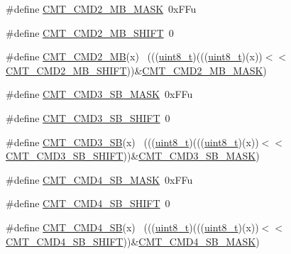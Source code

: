 \begin{DoxyCompactItemize}
\item 
\#define \hyperlink{group___c_m_t___register___masks_gac9616164033684cd0d73e63eb6381441}{C\+M\+T\+\_\+\+C\+M\+D2\+\_\+\+M\+B\+\_\+\+M\+A\+SK}~0x\+F\+Fu
\item 
\#define \hyperlink{group___c_m_t___register___masks_gaeff28d00f2825fc455b2f37c218ce24f}{C\+M\+T\+\_\+\+C\+M\+D2\+\_\+\+M\+B\+\_\+\+S\+H\+I\+FT}~0
\item 
\#define \hyperlink{group___c_m_t___register___masks_gab2a79ddcd28a1921a654f06e9c9cb15f}{C\+M\+T\+\_\+\+C\+M\+D2\+\_\+\+MB}(x)                                                  ~(((\hyperlink{_p_e___types_8h_aba7bc1797add20fe3efdf37ced1182c5}{uint8\+\_\+t})(((\hyperlink{_p_e___types_8h_aba7bc1797add20fe3efdf37ced1182c5}{uint8\+\_\+t})(x))$<$$<$\hyperlink{group___c_m_t___register___masks_gaeff28d00f2825fc455b2f37c218ce24f}{C\+M\+T\+\_\+\+C\+M\+D2\+\_\+\+M\+B\+\_\+\+S\+H\+I\+FT}))\&\hyperlink{group___c_m_t___register___masks_gac9616164033684cd0d73e63eb6381441}{C\+M\+T\+\_\+\+C\+M\+D2\+\_\+\+M\+B\+\_\+\+M\+A\+SK})
\item 
\#define \hyperlink{group___c_m_t___register___masks_ga0ee814da2957c935fad8b236d52b22f5}{C\+M\+T\+\_\+\+C\+M\+D3\+\_\+\+S\+B\+\_\+\+M\+A\+SK}~0x\+F\+Fu
\item 
\#define \hyperlink{group___c_m_t___register___masks_ga87210814a860e3ea66f06747156fbd9a}{C\+M\+T\+\_\+\+C\+M\+D3\+\_\+\+S\+B\+\_\+\+S\+H\+I\+FT}~0
\item 
\#define \hyperlink{group___c_m_t___register___masks_gaef6988a6aed5fc7ec042e6db619d568b}{C\+M\+T\+\_\+\+C\+M\+D3\+\_\+\+SB}(x)                                                  ~(((\hyperlink{_p_e___types_8h_aba7bc1797add20fe3efdf37ced1182c5}{uint8\+\_\+t})(((\hyperlink{_p_e___types_8h_aba7bc1797add20fe3efdf37ced1182c5}{uint8\+\_\+t})(x))$<$$<$\hyperlink{group___c_m_t___register___masks_ga87210814a860e3ea66f06747156fbd9a}{C\+M\+T\+\_\+\+C\+M\+D3\+\_\+\+S\+B\+\_\+\+S\+H\+I\+FT}))\&\hyperlink{group___c_m_t___register___masks_ga0ee814da2957c935fad8b236d52b22f5}{C\+M\+T\+\_\+\+C\+M\+D3\+\_\+\+S\+B\+\_\+\+M\+A\+SK})
\item 
\#define \hyperlink{group___c_m_t___register___masks_ga634397e39fb458afba9c0cfefdfc36d8}{C\+M\+T\+\_\+\+C\+M\+D4\+\_\+\+S\+B\+\_\+\+M\+A\+SK}~0x\+F\+Fu
\item 
\#define \hyperlink{group___c_m_t___register___masks_gac4d14f573bc993ac68f7cc9242fbe888}{C\+M\+T\+\_\+\+C\+M\+D4\+\_\+\+S\+B\+\_\+\+S\+H\+I\+FT}~0
\item 
\#define \hyperlink{group___c_m_t___register___masks_ga346b641d1b301aa99d317d8a98c62c97}{C\+M\+T\+\_\+\+C\+M\+D4\+\_\+\+SB}(x)                                                  ~(((\hyperlink{_p_e___types_8h_aba7bc1797add20fe3efdf37ced1182c5}{uint8\+\_\+t})(((\hyperlink{_p_e___types_8h_aba7bc1797add20fe3efdf37ced1182c5}{uint8\+\_\+t})(x))$<$$<$\hyperlink{group___c_m_t___register___masks_gac4d14f573bc993ac68f7cc9242fbe888}{C\+M\+T\+\_\+\+C\+M\+D4\+\_\+\+S\+B\+\_\+\+S\+H\+I\+FT}))\&\hyperlink{group___c_m_t___register___masks_ga634397e39fb458afba9c0cfefdfc36d8}{C\+M\+T\+\_\+\+C\+M\+D4\+\_\+\+S\+B\+\_\+\+M\+A\+SK})
$$
\end{DoxyCompactItemize}

